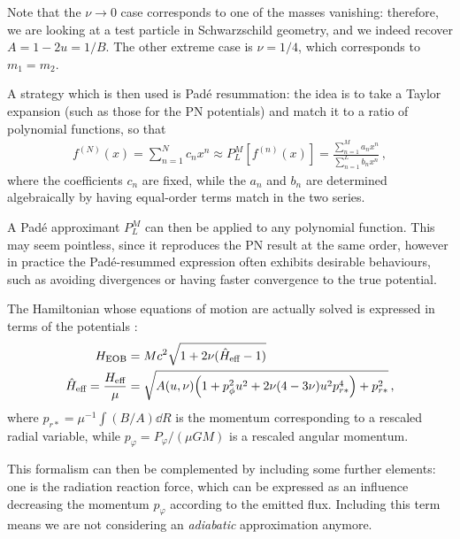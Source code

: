 \documentclass[main.tex]{subfiles}
\begin{document}
Note that the \(\nu \to 0\) case corresponds to one of the masses vanishing: therefore, we are looking at a test particle in Schwarzschild geometry, and we indeed recover \(A = 1-2u = 1/B\).
The other extreme case is \(\nu = 1/4\), which corresponds to \(m_1 = m_2 \). 

A strategy which is then used is Padé resummation: 
the idea is to take a Taylor expansion (such as those for the \ac{PN} potentials) and match it to 
a ratio of polynomial functions, so that 
%
\begin{align}
f^{(N)}(x) = \sum _{n=1}^{N} c_n x^{n} \approx P_{L}^{M}[f^{(n)}(x)] = \frac{\sum _{n=1}^{M} a_n x^{n}}{\sum _{n=1}^{L} b_n x^{n}}
\,,
\end{align}
%
where the coefficients \(c_n\) are fixed, while the \(a_n\) and \(b_n\) are determined algebraically 
by having equal-order terms match in the two series. 

A Padé approximant \(P_{L}^{M}\) can then be applied to any polynomial function. 
This may seem pointless, since it reproduces the \ac{PN} result at the same order, however in practice the Padé-resummed expression often exhibits desirable behaviours, such as avoiding divergences or having faster convergence to the true potential. 

The Hamiltonian whose equations of motion are actually solved is expressed in terms of the potentials \cite[eq.\ 8.22]{bernuzziNotesGravitationalWaves2021}:  
%
\begin{align}
H _{\text{EOB}} &= Mc^2 \sqrt{1 + 2 \nu (\hat{H} _{\text{eff}} - 1 )}  \\
\hat{H} _{\text{eff}} = \frac{H_{\text{eff}}}{\mu } &= 
\sqrt{ A(u, \nu ) \qty(1 + p^2_{\phi } u^2 + 2 \nu (4-3 \nu ) u^2 p^{4}_{r*}) + p^2_{r*}}
\,,
\end{align}
%
where \(p_{r*} = \mu^{-1} \int (B/A) \dd{R} \) is the momentum corresponding to a rescaled radial variable, while \(p_\varphi = P_\varphi / (\mu GM)\) is a rescaled angular momentum. 



This formalism can then be complemented by including some further elements: one is the radiation reaction force, which can be expressed as an influence decreasing the momentum \(p_\varphi \) according to the emitted flux.
Including this term means we are not considering an \emph{adiabatic} approximation anymore. 
\end{document}
